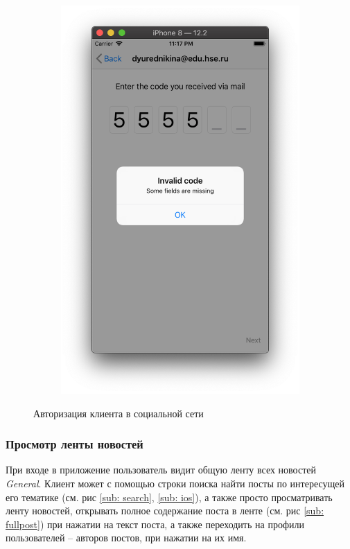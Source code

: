 \documentclass[a4paper,12pt]{article}
\begin{document}
\begin{figure}[h!]
\begin{subfigure}[b]{0.3\linewidth}
			\includegraphics[width=\linewidth]{../includes/pmi/invalidcode.png}
		\end{subfigure}
		\caption{\label{pic: auto} Авторизация клиента в социальной сети}
	\end{figure}
	\clearpage
	\subsubsection{Просмотр ленты новостей}
	При входе в приложение пользователь видит общую ленту всех новостей \textit{General}. Клиент может с помощью строки поиска найти посты по интересущей его тематике (см. рис \ref{sub: search}, \ref{sub: ios}), а также просто просматривать ленту новостей, открывать полное содержание поста в ленте (см. рис \ref{sub: fullpost}) при нажатии на текст поста, а также переходить на профили пользователей -- авторов постов, при нажатии на их имя.
	
\end{document}
